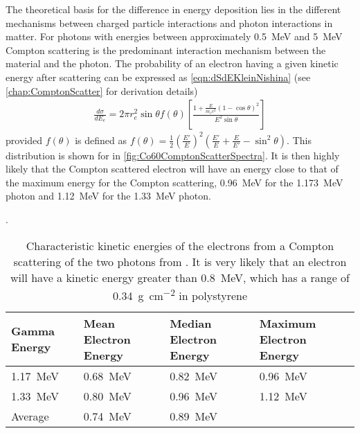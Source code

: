 
The theoretical basis for the difference in energy deposition lies in the different mechanisms between charged particle interactions and photon interactions in matter.
For photons with energies between approximately \SI{0.5}{\MeV} and \SI{5}{\MeV} Compton scattering is the predominant interaction mechanism between the material and the photon.
The probability of an electron having a given kinetic energy after scattering can be expressed as \eqref{eqn:dSdEKleinNishina} (see \autoref{chap:ComptonScatter} for derivation details)
\begin{align}
  \label{eqn:dSdEKleinNishina}
\frac{d\sigma}{dE_e} = 2\pi r_e^2 \sin \theta f(\theta)\left [ \frac{1+\frac{E}{m_e c^2}\left(1-\cos\theta \right)^2}{E^2 \sin \theta} \right ]
\end{align}
provided  $f(\theta)$ is defined as $f(\theta) = \frac{1}{2}\left(\frac{E'}{E}\right)^2 \left(\frac{E'}{E} + \frac{E}{E'}-\sin^2\theta\right)$.
This distribution is shown for  in \autoref{fig:Co60ComptonScatterSpectra}.
It is then highly likely that the Compton scattered electron will have an energy close to that of the maximum energy for the Compton scattering, \SI{0.96}{\MeV} for the \SI{1.173}{\MeV} photon and \SI{1.12}{\MeV} for the \SI{1.33}{\MeV} photon.
\begin{table}
	\caption[Characterstic Energies of Compton Scattered Electrons from Co-60]{Characteristic kinetic energies of the electrons from a Compton scattering of the two photons from . It is very likely that an electron will have a kinetic energy greater than \SI{0.8}{\MeV}, which has a range of \SI{0.34}{\gram\per\cm\squared} in polystyrene}.
	\label{tab:ComptonEnergiesCo60}
	\begin{tabular}{ m{4cm} m{3cm} m{3cm} m{3cm}}
	\toprule
	Gamma Energy & Mean Electron Energy & Median Electron Energy & Maximum Electron Energy \\
	\midrule
	\SI{1.17}{\MeV} & \SI{0.68}{\MeV} & \SI{0.82}{\MeV} & \SI{0.96}{\MeV} \\
	\SI{1.33}{\MeV} & \SI{0.80}{\MeV} & \SI{0.96}{\MeV} & \SI{1.12}{\MeV} \\
	Average & \SI{0.74}{\MeV} & \SI{0.89}{\MeV} &  \\
	\bottomrule
	\end{tabular}
\end{table}
